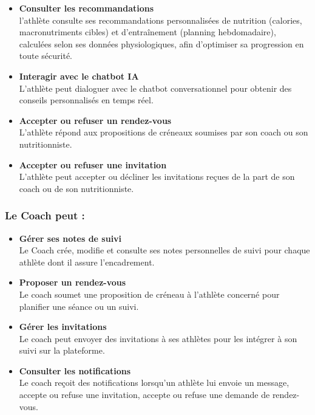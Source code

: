 ﻿\documentclass[a4paper,12pt]{report}
\begin{document}
\begin{itemize}
    \item \textbf{Consulter les recommandations} \\
    l'athlète consulte ses recommandations personnalisées de nutrition (calories, macronutriments cibles) et d'entraînement (planning hebdomadaire), calculées selon ses données physiologiques, 
    afin d'optimiser sa progression en toute sécurité.
    \item \textbf{Interagir avec le chatbot IA} \\
    L'athlète peut dialoguer avec le chatbot 
    conversationnel  pour obtenir des conseils personnalisés 
    en temps réel.
    \item \textbf{Accepter ou refuser un rendez-vous} \\
    L'athlète répond aux propositions de 
    créneaux soumises par son coach ou son nutritionniste.
    \item \textbf{Accepter ou refuser une invitation} \\
    L'athlète peut accepter ou décliner 
    les invitations reçues de la part de son coach ou de son nutritionniste.
\end{itemize}
\subsubsection*{Le Coach peut :}
\begin{itemize}
    
    \item \textbf{Gérer ses notes de suivi} \\
    Le Coach crée, modifie et consulte ses notes 
    personnelles de suivi pour chaque athlète dont il assure l'encadrement.
   
    \item \textbf{Proposer un rendez-vous} \\
    Le coach soumet une proposition de créneau à 
    l'athlète concerné pour planifier une séance ou un suivi.
    \item \textbf{Gérer les invitations} \\
    Le coach peut envoyer des invitations à ses athlètes 
    pour les intégrer à son suivi sur la plateforme.
    \item \textbf{Consulter les notifications} \\
    Le coach reçoit des notifications lorsqu'un athlète lui envoie un message, accepte ou refuse une invitation, accepte ou refuse une demande de rendez-vous.
\end{itemize}
\end{document}
